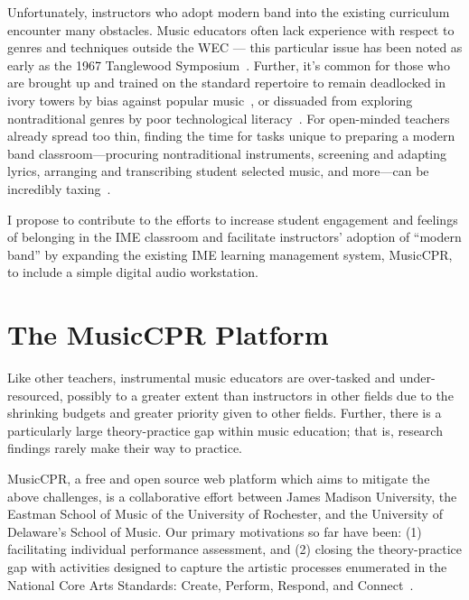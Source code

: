 \documentclass[manuscript,screen,review]{acmart}
\begin{document}
Unfortunately, instructors who adopt modern band into the existing curriculum encounter many obstacles.
Music educators often lack experience with respect to genres and techniques outside the WEC ---
this particular issue has been noted as early as the 1967 Tanglewood Symposium~\cite{Lehman20, Vasil23}.
Further, it's common for those who are brought up and trained on the standard repertoire to remain deadlocked in ivory towers by bias against popular music~\cite{ClauhsSanguinetti}, or dissuaded from exploring nontraditional genres by poor technological literacy~\cite{Bannerman}.
For open-minded teachers already spread too thin, finding the time for tasks unique to preparing a modern band classroom---procuring nontraditional instruments, screening and adapting lyrics, arranging and transcribing student selected music, and more---can be incredibly taxing~\cite{Vasil23}. 

I propose to contribute to the efforts to increase student engagement and feelings of belonging in the IME classroom and facilitate instructors' adoption of ``modern band'' by expanding the existing IME learning management system, MusicCPR, to include a simple digital audio workstation.


\section{The M\MakeLowercase{usic}CPR Platform}
Like other teachers, instrumental music educators are over-tasked and under-resourced, possibly to a greater extent than instructors in other fields due to the shrinking budgets and greater priority given to other fields.
Further, there is a particularly large theory-practice gap within music education; that is, research findings rarely make their way to practice.

MusicCPR, a free and open source web platform which aims to mitigate the above challenges, is a collaborative effort between James Madison University, the Eastman School of Music of the University of Rochester, and the University of Delaware's School of Music. 
Our primary motivations so far have been: (1) facilitating individual performance assessment, and (2) closing the theory-practice gap with activities designed to capture the artistic processes enumerated in the National Core Arts Standards: Create, Perform, Respond, and Connect~\cite{core_arts, CPR}.
\end{document}
